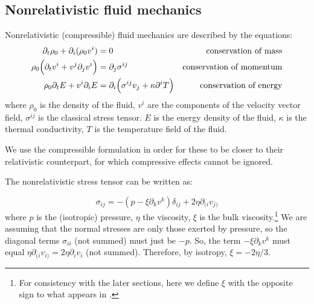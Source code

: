 \documentclass[main.tex]{subfiles}
\begin{document}
\subsection{Nonrelativistic fluid mechanics} \label{sec:nonrelativisti-fluid-mechanics}

Nonrelativistic (compressible) fluid mechanics are described by the equations:
\begin{subequations}
\begin{align}
    \partial_t \rho_0 + \partial_i (\rho_0 v^i) &= 0 &\text{conservation of mass} \label{eq:classical-conservation-mass}\\
    \rho_0 \qty(\partial_t v^i + v^j \partial_j v^i) &= \partial_j \sigma^{ij} &\text{conservation of momentum}  \label{eq:classical-conservation-momentum}\\
    \rho_0 \partial_t E + v^i \partial_i E &= \partial_i \qty(\sigma^{ij}v_j + \kappa\partial^i T) &\text{conservation of energy} \label{eq:classical-conservation-energy}
\end{align}
\end{subequations}
where $\rho_0$ is the density of the fluid,
$v^i$ are the components of the velocity vector field,
$\sigma^{ij}$ is the classical stress tensor. %
$E$ is the energy density of the fluid,
$\kappa$ is the thermal conductivity,
$T$ is the temperature  field of the fluid.

We use the compressible formulation in order for these to be closer to their relativistic counterpart, for which compressive effects cannot be ignored.

The nonrelativistic stress tensor can be written as:

\begin{equation}
    \sigma_{ij} = -(p - \xi \partial_k v^k ) \delta_{ij} + 2 \eta \partial_{(i} v_{j)}
\end{equation}
where $p$ is the (isotropic) pressure, $\eta$ the viscosity, $\xi$ is the bulk viscosity.\footnote{For consistency with the later sections, here we define \(\xi\) with the opposite sign to what appears in \cite[page 301]{Taub:1978}.} We are assuming that the normal stresses are only those exerted by pressure, so the diagonal terms $\sigma_{ii}$ (not summed) must just be $-p$. So, the term $-\xi \partial_k v^k$ must equal $\eta \partial_{(i} v_{i)} = 2\eta \partial_i v_i$ (not summed). Therefore, by isotropy, $\xi = -2\eta/3$.
\end{document}
